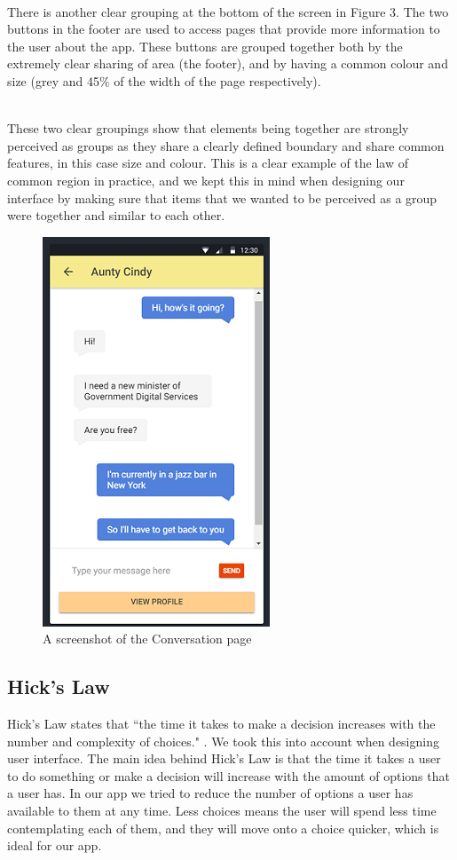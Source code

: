 \documentclass[a4paper, 11pt]{article}
\begin{document}
~\\
There is another clear grouping at the bottom of the screen in Figure 3. The two buttons in the footer are used to access pages that provide more information to the user about the app. These buttons are grouped together both by the extremely clear sharing of area (the footer), and by having a common colour and size (grey and 45\% of the width of the page respectively).

~\\
These two clear groupings show that elements being together are strongly perceived as groups as they share a clearly defined boundary and share common features, in this case size and colour. This is a clear example of the law of common region in practice, and we kept this in mind when designing our interface by making sure that items that we wanted to be perceived as a group were together and similar to each other.  

\begin{figure}

\centering
\captionsetup{format=hang}
\includegraphics{choices.png}
\caption{A screenshot of the Conversation page}
\end{figure}
\subsection{Hick's Law}
Hick's Law states that ``the time it takes to make a decision increases with the number and complexity of choices." \cite{hicks}. We took this into account when designing user interface. The main idea behind Hick's Law is that the time it takes a user to do something or make a decision will increase with the amount of options that a user has. In our app we tried to reduce the number of options a user has available to them at any time. Less choices means the user will spend less time contemplating each of them, and they will move onto a choice quicker, which is ideal for our app.
\end{document}
